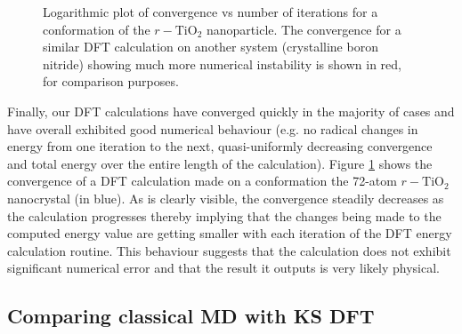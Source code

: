 \documentclass[aps,prb,twocolumn,amsmath,amssymb,superscriptaddress,longbibliography]{revtex4-1}
\newcommand\tab[1][1cm]{\hspace*{#1}} %
\begin{document}
\begin{figure}[htb]
\caption{Logarithmic plot of convergence vs number of iterations for a conformation of the $r-\text{TiO}_{2}$ nanoparticle. The convergence for a similar DFT calculation on another system (crystalline boron nitride) showing much more numerical instability is shown in red, for comparison purposes.}
\label{conv}
\end{figure}

\tab Finally, our DFT calculations have converged quickly in the majority of cases and have overall exhibited good numerical behaviour (e.g. no radical changes in energy from one iteration to the next, quasi-uniformly decreasing convergence and total energy over the entire length of the calculation).
Figure \ref{conv} shows the convergence of a DFT calculation made on a conformation the 72-atom $r-\text{TiO}_2$ nanocrystal (in blue).
As is clearly visible, the convergence steadily decreases as the calculation progresses thereby implying that the changes being made to the computed energy value are getting smaller with each iteration of the DFT energy calculation routine.
This behaviour suggests that the calculation does not exhibit significant numerical error and that the result it outputs is very likely physical.

\subsection{Comparing classical MD with KS DFT}
\end{document}

